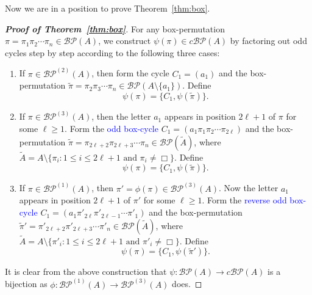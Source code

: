 \documentclass[12pt]{amsart}
\numberwithin{equation}{section}
\def\blue{\textcolor{blue}}
\theoremstyle{plain}
\theoremstyle{definition}
\newcommand{\BP}{\mathcal{BP}}
\newcommand{\cBP}{c\mathcal{BP}}
\begin{document}
Now we are in a position to prove Theorem~\ref{thm:box}. 

\begin{proof}[{\bf Proof of Theorem~\ref{thm:box}}] For any box-permutation $\pi=\pi_1\pi_2\cdots\pi_n\in\BP(A)$, we construct $\psi(\pi)\in\cBP(A)$ by factoring out odd cycles step by step according to the following three cases:
\begin{enumerate}
\item If $\pi\in\BP^{(2)}(A)$, then form the cycle $C_1=(a_1)$ and the box-permutation $\tilde\pi=\pi_2\pi_3\cdots\pi_n\in\BP(A\setminus\{a_1\})$. Define 
$$
\psi(\pi)=\{C_1,\psi(\tilde\pi)\}.
$$
\item  If $\pi\in\BP^{(3)}(A)$, then the letter $a_1$ appears in position $2\ell+1$ of $\pi$ for some $\ell\geq1$. Form the \blue{odd box-cycle} $C_1=(a_1\pi_{1}\pi_2\cdots\pi_{2\ell})$ and the box-permutation $\tilde\pi=\pi_{2\ell+2}\pi_{2\ell+3}\cdots\pi_n\in\BP(\tilde A)$, where $\tilde{A}=A\setminus\{\pi_i:1\leq i\leq {2\ell+1}\text{ and } \pi_i\neq\Box\}$. Define 
$$
\psi(\pi)=\{C_1,\psi(\tilde\pi)\}.
$$
\item If $\pi\in\BP^{(1)}(A)$, then $\pi'=\phi(\pi)\in \BP^{(3)}(A)$. Now the letter $a_1$ appears in position $2\ell+1$ of $\pi'$ for some $\ell\geq1$. Form the \blue{reverse odd box-cycle} $C_1=(a_1\pi'_{2\ell}\pi'_{2\ell-1}\cdots\pi'_{1})$ and the box-permutation $\tilde\pi'=\pi'_{2\ell+2}\pi'_{2\ell+3}\cdots\pi'_n\in\BP(\tilde A)$, where $\tilde{A}=A\setminus\{\pi'_i:1\leq i\leq {2\ell+1}\text{ and } \pi'_i\neq\Box\}$. Define 
$$
\psi(\pi)=\{C_1,\psi(\tilde\pi')\}.
$$
\end{enumerate}

It is clear from the above construction that $\psi: \BP(A)\rightarrow\cBP(A)$ is a bijection as $\phi:\BP^{(1)}(A)\rightarrow\BP^{(3)}(A)$ does. 
\end{proof}
\end{document}
